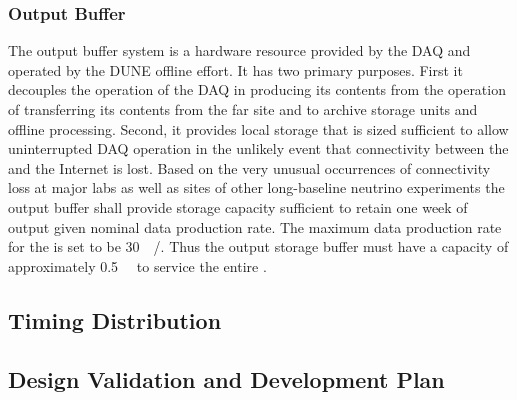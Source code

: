 
\subsubsection{Output Buffer}


The output buffer system is a hardware resource provided by the DAQ and operated by the DUNE offline effort. 
It has two primary purposes. 
First it decouples the operation of the DAQ in producing its contents from the operation of transferring its contents from the far site and to archive storage units and offline processing. 
Second, it provides local storage that is sized sufficient to allow uninterrupted DAQ operation in the unlikely event that connectivity between the  and the Internet is lost. 
Based on the very unusual occurrences of connectivity loss at major labs as well as  sites of other long-baseline neutrino experiments the output buffer shall provide storage capacity sufficient to retain one week of output given nominal data production rate. 
The maximum data production rate for the  is set to be \SI{30}{\peta\byte/\year}. 
Thus the output storage buffer must have a capacity of approximately \SI{0.5}{\peta\byte} to service the entire .




\subsection{Timing Distribution}
\label{sec:sp-daq:design-timing}


\subsection{Design Validation and Development Plan}
\label{sec:sp-daq:design-validation}


